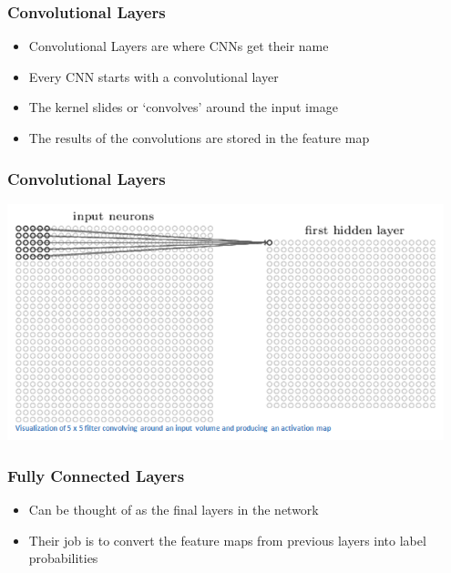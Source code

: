 \documentclass{beamer}
\begin{document}
\begin{frame}
  \frametitle{Convolutional Layers}
  \begin{itemize}
	\item Convolutional Layers are where CNNs get their name
	\item Every CNN starts with a convolutional layer
	\item The kernel slides or `convolves' around the input image
	\item The results of the convolutions are stored in the feature map
  \end{itemize}
\end{frame}

\begin{frame}
  \frametitle{Convolutional Layers}
   \includegraphics[width=0.95\textwidth]{ActivationMap.png}
       \\
\end{frame}

\begin{frame}
  \frametitle{Fully Connected Layers} 
  \begin{itemize}
	\item Can be thought of as the final layers in the network
	\item Their job is to convert the feature maps from previous layers into label probabilities	
  \end{itemize}
\end{frame}
\end{document}
